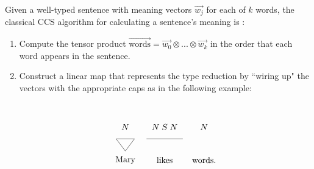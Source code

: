 Given a well-typed sentence with meaning vectors $\vec{w_j}$ for each of $k$ words, the classical CCS algorithm for calculating a sentence's meaning is \cite{clark2013quantum}:
\begin{enumerate}
\item Compute the tensor product $\overrightarrow{\mbox{words}}=\vec{w_0}\otimes...\otimes \vec{w_k}$ in the order that each word appears in the sentence.

\item Construct a linear map that represents the type reduction by ``wiring up" the vectors with the appropriate caps as in the following example:

\begin{equation}
\label{eq:svo}
\begin{aligned}
\begin{tikzpicture}[scale=0.5, yscale=-1]     
                \node (0) at (-3.5, 1) {};
                \node (1) at (-2, 1) {};
                \node (2) at (-2.75, 2) {};
                \node (3) at (-1, 1) {};
                \node (4) at (2, 1) {};
                \node (5) at (0.5, 2.25) {};
                \node (6) at (4.5, 1) {};
                \node (7) at (3.75, 2) {};
                \node (8) at (3, 1) {};
                \node (9) at (-2.75, 1) {};
                \node (10) at (-0.25, 1) {};
                \node (11) at (0.5, 1) {};
                \node (12) at (1.25, 1) {};
                \node (13) at (3.75, 1) {};
                \node (14) at (-2.75, 0.5) {};
                \node (15) at (-0.25, 0.5) {};
                \node (16) at (0.5, 0.5) {};
                \node (17) at (1.25, 0.5) {};
                \node (18) at (3.75, 0.5) {};
                \node (19) at (-2.75, 0) {$N$};
                \node (20) at (-0.25, 0) {$N$};
                \node (21) at (0.5, 0) {$S$};
                \node (22) at (1.25, 0) {$N$};
                \node (23) at (3.75, 0) {$N$};
                \node (24) at (-2.75, -0.5) {};
                \node (25) at (-0.25, -0.5) {};
                \node (26) at (0.5, -0.5) {};
                \node (27) at (1.25, -0.5) {};
                \node (28) at (3.75, -0.5) {};
                \node (29) at (0.5, -1.75) {};
                \node (30) at (-2.75, 2.75) {Mary};
                \node (31) at (0.5, 2.75) {likes};
                \node (32) at (3.75, 2.75) {words.};
                \draw (0.center) to (1.center);
                \draw (1.center) to (2.center);
                \draw (2.center) to (0.center);
                \draw  (3.center) to (4.center);

\end{tikzpicture}
\end{aligned}
\end{equation}
\end{enumerate}
